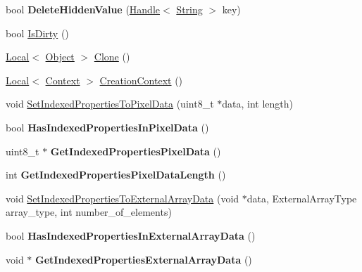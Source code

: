 \begin{DoxyCompactItemize}
\item 
\hypertarget{classv8_1_1_object_ab1d274da1949b1f68087728760ee4172}{}bool {\bfseries Delete\+Hidden\+Value} (\hyperlink{classv8_1_1_handle}{Handle}$<$ \hyperlink{classv8_1_1_string}{String} $>$ key)\label{classv8_1_1_object_ab1d274da1949b1f68087728760ee4172}

\item 
bool \hyperlink{classv8_1_1_object_a3c1f8cfb754b5d29d5f1998b2047befd}{Is\+Dirty} ()
\item 
\hyperlink{classv8_1_1_local}{Local}$<$ \hyperlink{classv8_1_1_object}{Object} $>$ \hyperlink{classv8_1_1_object_a5018c9d085aa71f65530cf1e073a04ad}{Clone} ()
\item 
\hyperlink{classv8_1_1_local}{Local}$<$ \hyperlink{classv8_1_1_context}{Context} $>$ \hyperlink{classv8_1_1_object_af6966283a7d7e20779961eed434db04d}{Creation\+Context} ()
\item 
void \hyperlink{classv8_1_1_object_a6c552c4817b9a0eff1fb12b7ef089026}{Set\+Indexed\+Properties\+To\+Pixel\+Data} (uint8\+\_\+t $\ast$data, int length)
\item 
\hypertarget{classv8_1_1_object_a984cb47ed59b73d3d1b32f393a653cd4}{}bool {\bfseries Has\+Indexed\+Properties\+In\+Pixel\+Data} ()\label{classv8_1_1_object_a984cb47ed59b73d3d1b32f393a653cd4}

\item 
\hypertarget{classv8_1_1_object_af2cefd0bcc50b19bb23b93b493ceb3d2}{}uint8\+\_\+t $\ast$ {\bfseries Get\+Indexed\+Properties\+Pixel\+Data} ()\label{classv8_1_1_object_af2cefd0bcc50b19bb23b93b493ceb3d2}

\item 
\hypertarget{classv8_1_1_object_ac6af430db5a41a0c9b6cacb507d95e0d}{}int {\bfseries Get\+Indexed\+Properties\+Pixel\+Data\+Length} ()\label{classv8_1_1_object_ac6af430db5a41a0c9b6cacb507d95e0d}

\item 
void \hyperlink{classv8_1_1_object_a530f661dec20ce1a0a1b15a45195418c}{Set\+Indexed\+Properties\+To\+External\+Array\+Data} (void $\ast$data, External\+Array\+Type array\+\_\+type, int number\+\_\+of\+\_\+elements)
\item 
\hypertarget{classv8_1_1_object_ae3c884315aaba6d11d3663a8569fe8f1}{}bool {\bfseries Has\+Indexed\+Properties\+In\+External\+Array\+Data} ()\label{classv8_1_1_object_ae3c884315aaba6d11d3663a8569fe8f1}

\item 
\hypertarget{classv8_1_1_object_a7763a639b0ec6d35f645d0d2facfd8ce}{}void $\ast$ {\bfseries Get\+Indexed\+Properties\+External\+Array\+Data} ()\label{classv8_1_1_object_a7763a639b0ec6d35f645d0d2facfd8ce}


\end{DoxyCompactItemize}
